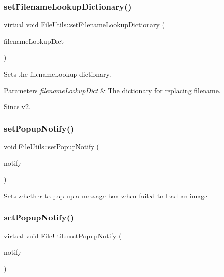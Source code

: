 \subsubsection{\texorpdfstring{set\+Filename\+Lookup\+Dictionary()}{setFilenameLookupDictionary()}\hspace{0.1cm}{\footnotesize\ttfamily [2/2]}}
{\footnotesize\ttfamily virtual void File\+Utils\+::set\+Filename\+Lookup\+Dictionary (\begin{DoxyParamCaption}\item[{const Value\+Map \&}]{filename\+Lookup\+Dict }\end{DoxyParamCaption})\hspace{0.3cm}{\ttfamily [virtual]}}

Sets the filename\+Lookup dictionary.


\begin{DoxyParams}{Parameters}
{\em filename\+Lookup\+Dict} & The dictionary for replacing filename. \\
\hline
\end{DoxyParams}
\begin{DoxySince}{Since}
v2. 
\end{DoxySince}
\mbox{\label{classFileUtils_abf036eb8785edfb8077c2d92444d55a4}} 
\subsubsection{\texorpdfstring{set\+Popup\+Notify()}{setPopupNotify()}\hspace{0.1cm}{\footnotesize\ttfamily [1/2]}}
{\footnotesize\ttfamily void File\+Utils\+::set\+Popup\+Notify (\begin{DoxyParamCaption}\item[{bool}]{notify }\end{DoxyParamCaption})\hspace{0.3cm}{\ttfamily [virtual]}}

Sets whether to pop-\/up a message box when failed to load an image. \mbox{\label{classFileUtils_a3763086a2f23fd47fc3ba77c56ab38a8}} 
\subsubsection{\texorpdfstring{set\+Popup\+Notify()}{setPopupNotify()}\hspace{0.1cm}{\footnotesize\ttfamily [2/2]}}
{\footnotesize\ttfamily virtual void File\+Utils\+::set\+Popup\+Notify (\begin{DoxyParamCaption}\item[{bool}]{notify }\end{DoxyParamCaption})\hspace{0.3cm}{\ttfamily [virtual]}}

